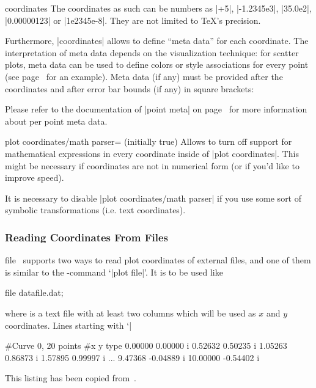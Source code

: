 {\begin{addplotoperation}[]{coordinates}{}
The coordinates as such can be numbers as |+5|, |-1.2345e3|, |35.0e2|, |0.00000123| or |1e2345e-8|. They are not limited to \TeX's precision.

Furthermore, |coordinates| allows to define ``meta data'' for each coordinate. The interpretation of meta data depends on the visualization technique: for scatter plots, meta data can be used to define colors or style associations for every point (see page~\pageref{pgfplots:scatterclasses} for an example). Meta data (if any) must be provided after the coordinates and after error bar bounds (if any) in square brackets:
\begin{codeexample}[]
\end{codeexample}
Please refer to the documentation of |point meta| on page~\pageref{pgfplots:point:meta} for more information about per point meta data.
\end{addplotoperation}

\begin{pgfplotskey}{plot coordinates/math parser= (initially true)}
	Allows to turn off support for mathematical expressions in every coordinate inside of |plot coordinates|. This might be necessary if coordinates are not in numerical form (or if you'd like to improve speed).

	It is necessary to disable |plot coordinates/math parser| if you use some sort of symbolic transformations (i.e. text coordinates).
\end{pgfplotskey}

\subsubsection{Reading Coordinates From Files}

\begin{addplotoperation}[]{file}{}
\label{pgfplots:addplot:file}
\PGFPlots\ supports two ways to read plot coordinates of external files, and one of them is similar to the \Tikz-command `|plot file|'. It is to be used like
\begin{codeexample}
\addplot file {datafile.dat};
\end{codeexample}
where  is a text file with at least two columns which will be used as $x$ and $y$ coordinates. Lines starting with `|%
\begin{codeexample}
#Curve 0, 20 points
#x y type
0.00000 0.00000 i
0.52632 0.50235 i
1.05263 0.86873 i
1.57895 0.99997 i
...
9.47368 -0.04889 i
10.00000 -0.54402 i
\end{codeexample}
This listing has been copied from~\cite[section~16.4]{tikz}.


\end{addplotoperation}}
